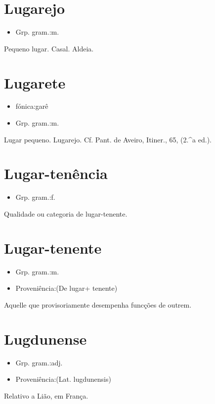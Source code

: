 \section{Lugarejo}
\begin{itemize}
\item {Grp. gram.:m.}
\end{itemize}
Pequeno lugar.
Casal.
Aldeia.
\section{Lugarete}
\begin{itemize}
\item {fónica:garê}
\end{itemize}
\begin{itemize}
\item {Grp. gram.:m.}
\end{itemize}
Lugar pequeno.
Lugarejo. Cf. Pant. de Aveiro, \textunderscore Itiner.\textunderscore , 65, (2.^a ed.).
\section{Lugar-tenência}
\begin{itemize}
\item {Grp. gram.:f.}
\end{itemize}
Qualidade ou categoria de lugar-tenente.
\section{Lugar-tenente}
\begin{itemize}
\item {Grp. gram.:m.}
\end{itemize}
\begin{itemize}
\item {Proveniência:(De \textunderscore lugar\textunderscore  + \textunderscore tenente\textunderscore )}
\end{itemize}
Aquelle que provisoriamente desempenha funcções de outrem.
\section{Lugdunense}
\begin{itemize}
\item {Grp. gram.:adj.}
\end{itemize}
\begin{itemize}
\item {Proveniência:(Lat. \textunderscore lugdunensis\textunderscore )}
\end{itemize}
Relativo a Lião, em França.
